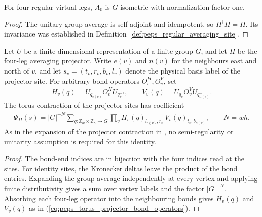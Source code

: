 \begin{lemma}%
    \label{thm:peps_regular_averaging_site_isometry}
    \leanok
    For four regular virtual legs, $A_0$ is $G$-isometric with
    normalization factor one.
\end{lemma}

\begin{proof}\leanok
    The unitary group average is self-adjoint and idempotent, so
    $\Pi^\dagger\Pi=\Pi$. Its invariance was established in
    Definition~\ref{def:peps_regular_averaging_site}.
\end{proof}

\begin{lemma}%
    \label{thm:peps_torus_projector_expansion}
    \leanok
    Let $U$ be a finite-dimensional representation of a finite group $G$, and let
    $\Pi$ be the four-leg averaging projector. Write $e(v)$ and $n(v)$ for the
    neighbours east and north of $v$, and let $s_v=(t_v,r_v,b_v,l_v)$ denote the
    physical basis label of the projector site. For arbitrary bond operators
    $O^H_v,O^V_v$, set
    \begin{align}
        H_v(q)=U_{q_{e(v)}}O^H_vU_{q_v^{-1}},\qquad
        V_v(q)=U_{q_v}O^V_vU_{q_{n(v)}^{-1}}.
        \label{eq:peps_torus_projector_bond_operators}
    \end{align}
    The torus contraction of the projector sites has coefficient
    \begin{align}
        \Psi_\Pi(s)=|G|^{-N}\sum_{q:\mathbb Z_w\times\mathbb Z_h\to G}
        \prod_v H_v(q)_{l_{e(v)},r_v}\,V_v(q)_{t_v,b_{n(v)}},
        \qquad N=wh.
    \end{align}
    As in the expansion of the projector contraction in
    \cite[Theorem~5.9]{Schuch2010PEPS}, no semi-regularity or unitarity assumption is required for this identity.
\end{lemma}
\begin{proof}\leanok
    The bond-end indices are in bijection with the four indices read at the sites.
    For identity sites, the Kronecker deltas leave the product of the bond entries.
    Expanding the group average independently at every vertex and applying finite distributivity
    gives a sum over vertex labels and the factor $|G|^{-N}$. Absorbing each
    four-leg operator into the neighbouring bonds gives $H_v(q)$ and $V_v(q)$ as in
    (\ref{eq:peps_torus_projector_bond_operators}).
\end{proof}

